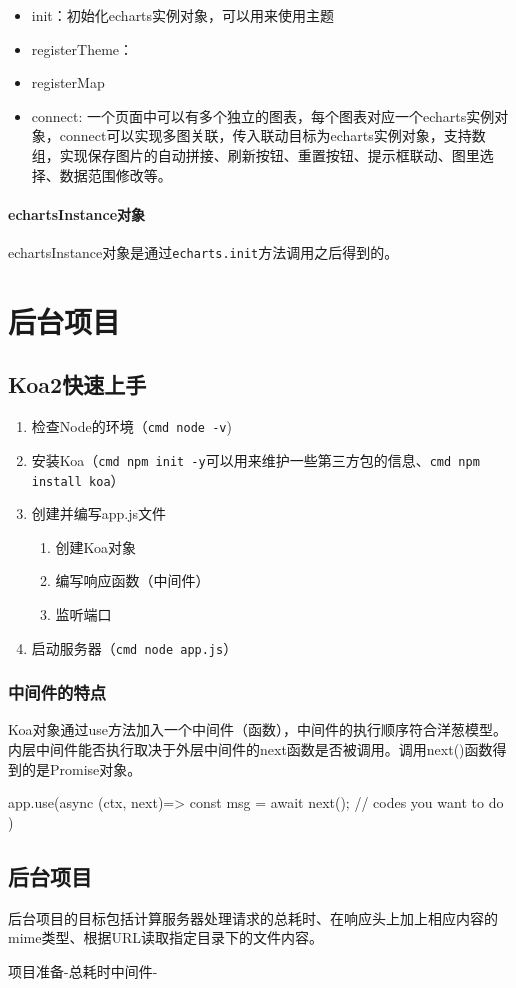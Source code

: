 \begin{itemize}
    \item init：初始化echarts实例对象，可以用来使用主题
    \item registerTheme：
    \item registerMap
    \item connect: 一个页面中可以有多个独立的图表，每个图表对应一个echarts实例对象，connect可以实现多图关联，传入联动目标为echarts实例对象，支持数组，实现保存图片的自动拼接、刷新按钮、重置按钮、提示框联动、图里选择、数据范围修改等。
\end{itemize}
\subsubsection{echartsInstance对象}
echartsInstance对象是通过\verb|echarts.init|方法调用之后得到的。

\chapter{后台项目}
\section{Koa2快速上手}
\begin{enumerate}
    \item 检查Node的环境（\verb|cmd node -v|)
    \item 安装Koa（\verb|cmd npm init -y|可以用来维护一些第三方包的信息、\verb|cmd npm install koa|）
    \item 创建并编写app.js文件
    \begin{enumerate}
        \item 创建Koa对象
        \item 编写响应函数（中间件）
        \item 监听端口
    \end{enumerate}
    \item 启动服务器（\verb|cmd node app.js|）
\end{enumerate}

\subsection{中间件的特点}
Koa对象通过use方法加入一个中间件（函数），中间件的执行顺序符合洋葱模型。内层中间件能否执行取决于外层中间件的next函数是否被调用。调用next()函数得到的是Promise对象。

\begin{js}
app.use(async (ctx, next)=>{
    const msg = await next();
    // codes you want to do
})
\end{js}

\section{后台项目}
后台项目的目标包括计算服务器处理请求的总耗时、在响应头上加上相应内容的mime类型、根据URL读取指定目录下的文件内容。

项目准备-总耗时中间件-